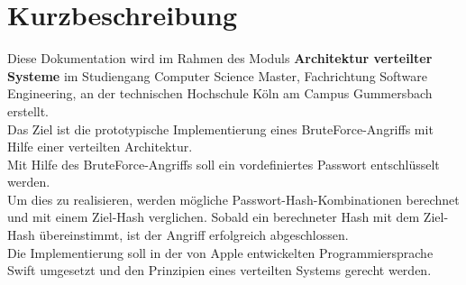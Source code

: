 \chapter*{Kurzbeschreibung}

Diese Dokumentation wird im Rahmen des Moduls \textbf{Architektur verteilter Systeme} im Studiengang Computer Science Master, Fachrichtung Software Engineering, an der technischen Hochschule Köln am Campus Gummersbach erstellt. \\

Das Ziel ist die prototypische Implementierung eines BruteForce-Angriffs mit Hilfe einer verteilten Architektur.\\
Mit Hilfe des BruteForce-Angriffs soll ein vordefiniertes Passwort entschlüsselt werden. \\
Um dies zu realisieren, werden mögliche Passwort-Hash-Kombinationen berechnet und mit einem Ziel-Hash verglichen. Sobald ein berechneter Hash mit dem Ziel-Hash übereinstimmt, ist der Angriff erfolgreich abgeschlossen. \\

Die Implementierung soll in der von Apple\textsuperscript{\textcopyright} entwickelten Programmiersprache Swift umgesetzt und den Prinzipien eines verteilten Systems gerecht werden.